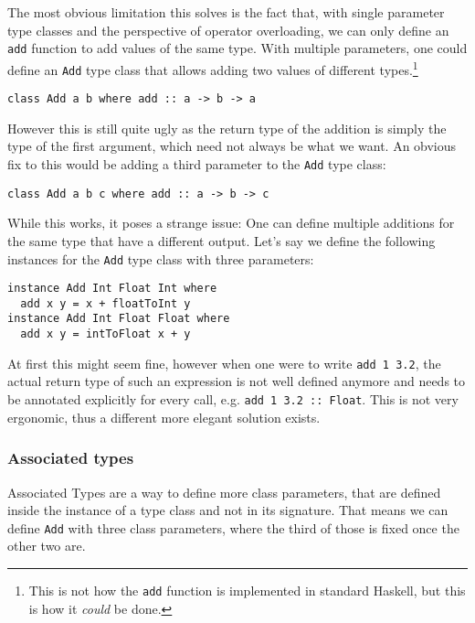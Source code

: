 The most obvious limitation this solves is the fact that, with single parameter type classes and the perspective of operator overloading, we can only define an \verb|add| function to add values of the same type. With multiple parameters, one could define an \verb|Add| type class that allows adding two values of different types.\footnote{This is not how the \verb|add| function is implemented in standard Haskell, but this is how it \emph{could} be done.}
\begin{verbatim}
class Add a b where add :: a -> b -> a
\end{verbatim}
However this is still quite ugly as the return type of the addition is simply the type of the first argument, which need not always be what we want. An obvious fix to this would be adding a third parameter to the \verb|Add| type class:
\begin{verbatim}
class Add a b c where add :: a -> b -> c
\end{verbatim}
While this works, it poses a strange issue: One can define multiple additions for the same type that have a different output. Let's say we define the following instances for the \verb|Add| type class with three parameters:
\begin{verbatim}
instance Add Int Float Int where
  add x y = x + floatToInt y
instance Add Int Float Float where
  add x y = intToFloat x + y
\end{verbatim}
At first this might seem fine, however when one were to write \verb|add 1 3.2|, the actual return type of such an expression is not well defined anymore and needs to be annotated explicitly for every call, e.g. \verb|add 1 3.2 :: Float|. This is not very ergonomic, thus a different more elegant solution exists.


\subsubsection{Associated types}


Associated Types are a way to define more class parameters, that are defined inside the instance of a type class and not in its signature. That means we can define \verb|Add| with three class parameters, where the third of those is fixed once the other two are.

